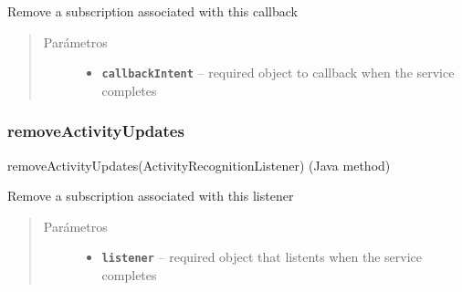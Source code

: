 \begin{fulllineitems}
\label{org/hardroid/api/ActivityRecognitionApi:org.hardroid.api.ActivityRecognitionApi.removeActivityUpdates(PendingIntent)} \par
Remove a subscription associated with this callback
\begin{quote}\begin{description}
\item[{Parámetros}] \leavevmode\begin{itemize}
\item {} 
\textbf{\texttt{callbackIntent}} -- required object to callback when the service completes

\end{itemize}

\end{description}\end{quote}

\end{fulllineitems}



\subsubsection{removeActivityUpdates}
\label{org/hardroid/api/ActivityRecognitionApi:id1}removeActivityUpdates(ActivityRecognitionListener) (Java method)

\begin{fulllineitems}
\label{org/hardroid/api/ActivityRecognitionApi:org.hardroid.api.ActivityRecognitionApi.removeActivityUpdates(ActivityRecognitionListener)}\par
Remove a subscription associated with this listener
\begin{quote}\begin{description}
\item[{Parámetros}] \leavevmode\begin{itemize}
\item {} 
\textbf{\texttt{listener}} -- required object that listents when the service completes

\end{itemize}

\end{description}\end{quote}

\end{fulllineitems}



